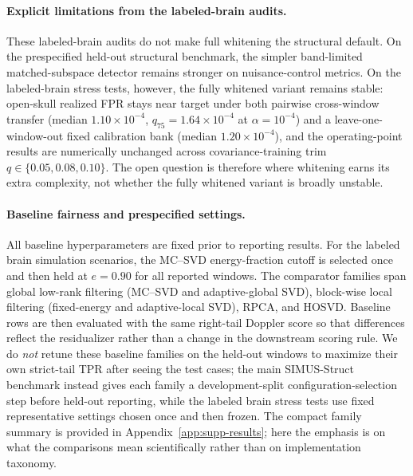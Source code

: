 \documentclass[11pt]{article}
\newif\ifSTAPPAPERONLY
\newcommand{\SuppOrApp}[1]{\ifSTAPPAPERONLY Supplementary Material\else Appendix~\ref{#1}\fi}
\begin{document}
\paragraph{Explicit limitations from the labeled-brain audits.}
These labeled-brain audits do not make full whitening the structural default. On the prespecified held-out structural benchmark, the simpler band-limited matched-subspace detector remains stronger on nuisance-control metrics. On the labeled-brain stress tests, however, the fully whitened variant remains stable: open-skull realized FPR stays near target under both pairwise cross-window transfer (median $1.10\times 10^{-4}$, $q_{75}=1.64\times 10^{-4}$ at $\alpha=10^{-4}$) and a leave-one-window-out fixed calibration bank (median $1.20\times 10^{-4}$), and the operating-point results are numerically unchanged across covariance-training trim $q\in\{0.05,0.08,0.10\}$. The open question is therefore where whitening earns its extra complexity, not whether the fully whitened variant is broadly unstable.

\paragraph{Baseline fairness and prespecified settings.}
All baseline hyperparameters are fixed prior to reporting results. For the labeled brain simulation scenarios, the MC--SVD energy-fraction cutoff is selected once and then held at $e=0.90$ for all reported windows. The comparator families span global low-rank filtering (MC--SVD and adaptive-global SVD), block-wise local filtering (fixed-energy and adaptive-local SVD), RPCA, and HOSVD. Baseline rows are then evaluated with the same right-tail Doppler score so that differences reflect the residualizer rather than a change in the downstream scoring rule. We do \emph{not} retune these baseline families on the held-out windows to maximize their own strict-tail TPR after seeing the test cases; the main SIMUS-Struct benchmark instead gives each family a development-split configuration-selection step before held-out reporting, while the labeled brain stress tests use fixed representative settings chosen once and then frozen. The compact family summary is provided in \SuppOrApp{app:supp-results}; here the emphasis is on what the comparisons mean scientifically rather than on implementation taxonomy.
\end{document}
